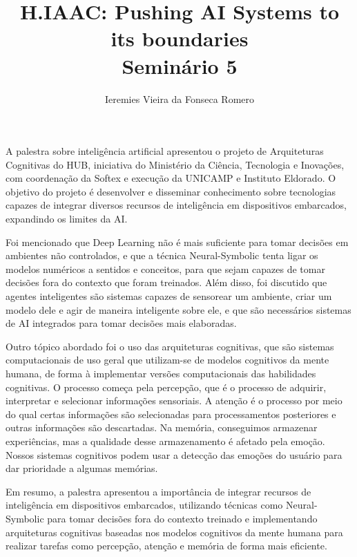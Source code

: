 \documentclass[11pt]{article}
\author{Ieremies Vieira da Fonseca Romero}
\date{}
\title{H.IAAC: Pushing AI Systems to its boundaries\\\medskip
\large Seminário 5}
\begin{document}
\maketitle
A palestra sobre inteligência artificial apresentou o projeto de Arquiteturas Cognitivas do HUB, iniciativa do Ministério da Ciência, Tecnologia e Inovações, com coordenação da Softex e execução da UNICAMP e Instituto Eldorado. O objetivo do projeto é desenvolver e disseminar conhecimento sobre tecnologias capazes de integrar diversos recursos de inteligência em dispositivos embarcados, expandindo os limites da AI.

Foi mencionado que Deep Learning não é mais suficiente para tomar decisões em ambientes não controlados, e que a técnica Neural-Symbolic tenta ligar os modelos numéricos a sentidos e conceitos, para que sejam capazes de tomar decisões fora do contexto que foram treinados. Além disso, foi discutido que agentes inteligentes são sistemas capazes de sensorear um ambiente, criar um modelo dele e agir de maneira inteligente sobre ele, e que são necessários sistemas de AI integrados para tomar decisões mais elaboradas.

Outro tópico abordado foi o uso das arquiteturas cognitivas, que são sistemas computacionais de uso geral que utilizam-se de modelos cognitivos da mente humana, de forma à implementar versões computacionais das habilidades cognitivas. O processo começa pela percepção, que é o processo de adquirir, interpretar e selecionar informações sensoriais. A atenção é o processo por meio do qual certas informações são selecionadas para processamentos posteriores e outras informações são descartadas. Na memória, conseguimos armazenar experiências, mas a qualidade desse armazenamento é afetado pela emoção. Nossos sistemas cognitivos podem usar a detecção das emoções do usuário para dar prioridade a algumas memórias.

Em resumo, a palestra apresentou a importância de integrar recursos de inteligência em dispositivos embarcados, utilizando técnicas como Neural-Symbolic para tomar decisões fora do contexto treinado e implementando arquiteturas cognitivas baseadas nos modelos cognitivos da mente humana para realizar tarefas como percepção, atenção e memória de forma mais eficiente.
\end{document}
